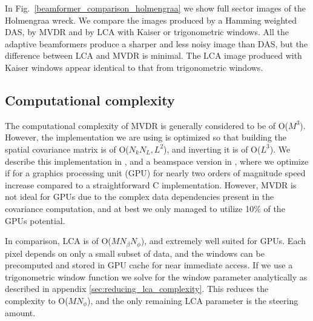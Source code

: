 \documentclass[10pt,journal,draftclsnofoot,onecolumn]{IEEEtran}
\newcommand\Fig[1]{Fig.~\ref{#1}}
\newcommand\1{\vec 1}
\begin{document}
In \Fig{beamformer_comparison_holmengraa} we show full sector images of the Holmengraa wreck. We compare the images produced by a Hamming weighted DAS, by MVDR and by LCA with Kaiser or trigonometric windows. All the adaptive beamformers produce a sharper and less noisy image than DAS, but the difference between LCA and MVDR is minimal. The LCA image produced with Kaiser windows appear identical to that from trigonometric windows.


\subsection{Computational complexity}\label{sec:results_complexity}

The computational complexity of MVDR is generally considered to be of O($M^3$). However, the implementation we are using is optimized so that building the spatial covariance matrix is of O($N_kN_L,L^2$), and inverting it is of O($L^3$). We describe this implementation in \cite{Buskenes2014}, and a beamspace version in \cite{Asen2013}, where we optimize if for a graphics processing unit (GPU) for nearly two orders of magnitude speed increase compared to a straightforward C implementation. However, MVDR is not ideal for GPUs due to the complex data dependencies present in the covariance computation, and at best we only managed to utilize 10\% of the GPUs potential.

In comparison, LCA is of O($M N_\beta N_\phi$), and extremely well suited for GPUs. Each pixel depends on only a small subset of data, and the windows can be precomputed and stored in GPU cache for near immediate access. If we use a trigonometric window function we solve for the window parameter analytically as described in appendix \ref{sec:reducing_lca_complexity}. This reduces the complexity to O($M N_\phi$), and the only remaining LCA parameter is the steering amount.



\end{document}
